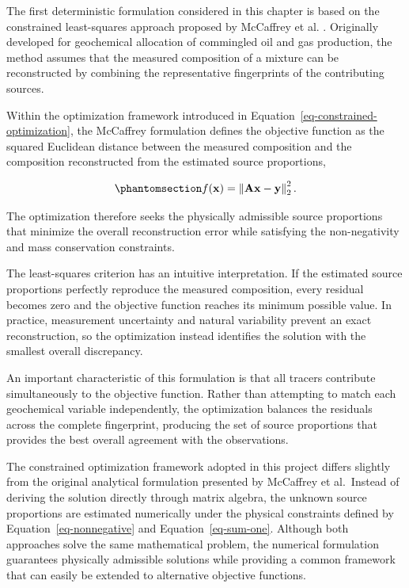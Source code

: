 \documentclass[
  12pt,
  letterpaper,
]{book}
\begin{document}
The first deterministic formulation considered in this chapter is based
on the constrained least-squares approach proposed by McCaffrey et al.
. Originally developed
for geochemical allocation of commingled oil and gas production, the
method assumes that the measured composition of a mixture can be
reconstructed by combining the representative fingerprints of the
contributing sources.

Within the optimization framework introduced in
Equation~\ref{eq-constrained-optimization}, the McCaffrey formulation
defines the objective function as the squared Euclidean distance between
the measured composition and the composition reconstructed from the
estimated source proportions,

\begin{equation}\phantomsection\label{eq-mccaffrey-objective}{
f(\mathbf{x})
=
\left\|
\mathbf{A}\mathbf{x}
-
\mathbf{y}
\right\|_2^2.
}\end{equation}

The optimization therefore seeks the physically admissible source
proportions that minimize the overall reconstruction error while
satisfying the non-negativity and mass conservation constraints.

The least-squares criterion has an intuitive interpretation. If the
estimated source proportions perfectly reproduce the measured
composition, every residual becomes zero and the objective function
reaches its minimum possible value. In practice, measurement uncertainty
and natural variability prevent an exact reconstruction, so the
optimization instead identifies the solution with the smallest overall
discrepancy.

An important characteristic of this formulation is that all tracers
contribute simultaneously to the objective function. Rather than
attempting to match each geochemical variable independently, the
optimization balances the residuals across the complete fingerprint,
producing the set of source proportions that provides the best overall
agreement with the observations.

The constrained optimization framework adopted in this project differs
slightly from the original analytical formulation presented by McCaffrey
et al.~Instead of deriving the solution directly through matrix algebra,
the unknown source proportions are estimated numerically under the
physical constraints defined by Equation~\ref{eq-nonnegative} and
Equation~\ref{eq-sum-one}. Although both approaches solve the same
mathematical problem, the numerical formulation guarantees physically
admissible solutions while providing a common framework that can easily
be extended to alternative objective functions.
\end{document}
